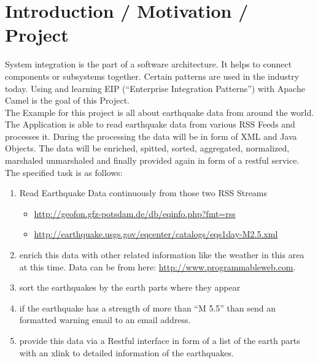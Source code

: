 \documentclass[11pt,english,ngerman, headsepline]{scrreprt}
\begin{document}


%
\tableofcontents{}

\pagestyle{scrheadings}    %



\chapter{Introduction / Motivation / Project}
 
System integration is the part of a software architecture. It helps to connect components or
subsystems together. Certain patterns are used in the industry today. Using and learning
EIP (“Enterprise Integration Patterns”) with Apache Camel is the goal of this
Project. \\

The Example for this project is all about earthquake data from
around the world. The Application is able to read earthquake data from various RSS Feeds and processes it. During
the processing the data will be in form of XML and Java Objects. The data will be enriched,
spitted, sorted, aggregated, normalized, marshaled unmarshaled and finally provided again
in form of a restful service.\\
 
 The specified task is as follows:
 
 \begin{enumerate}
   
 
 \item Read Earthquake Data continuously from those two RSS Streams
 \begin{itemize}
  	\item \url{http://geofon.gfz-potsdam.de/db/eqinfo.php?fmt=rss}
  	\item \url{http://earthquake.usgs.gov/eqcenter/catalogs/eqs1day-M2.5.xml}
  \end{itemize}
  \item enrich this data with other related information like the weather in this
  area at this time. Data can be from here: \url{http://www.programmableweb.com}.
  \item sort the earthquakes by the earth parts where they appear
  \item if the earthquake has a strength of more than ``M 5.5'' than send an
  formatted warning email to an email address.
  \item  provide this data via a Restful interface in form of a list of the
  earth parts with an xlink to detailed information of the earthquakes.
  
 \end{enumerate}
\end{document}
